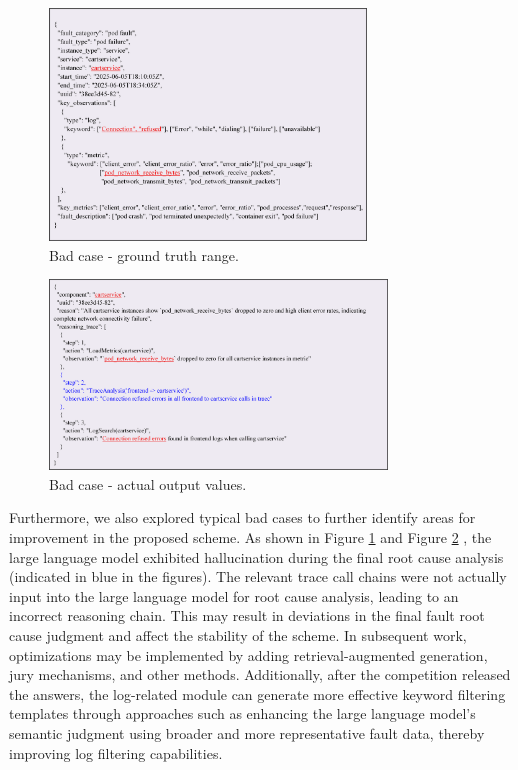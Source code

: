 \documentclass[10pt]{article}
\let\oldref\ref
\renewcommand{\ref}[1]{%
    \textcolor{blue}{\oldref{#1}}%
}
\begin{document}
\begin{figure}[!t]
    \centering
    \includegraphics[width=0.75\textwidth]{fig21.png}
    \caption{Bad case - ground truth range.}
    \label{fig21}
\end{figure}

\begin{figure}[!t]
    \centering
    \includegraphics[width=0.8\textwidth]{fig22.png}
    \caption{Bad case - actual output values.}
    \label{fig22}
\end{figure}

Furthermore, we also explored typical bad cases to further identify areas for improvement in the proposed scheme. As shown in Figure \ref{fig21} and Figure \ref{fig22}, the large language model exhibited hallucination during the final root cause analysis (indicated in blue in the figures). The relevant trace call chains were not actually input into the large language model for root cause analysis, leading to an incorrect reasoning chain. This may result in deviations in the final fault root cause judgment and affect the stability of the scheme. In subsequent work, optimizations may be implemented by adding retrieval-augmented generation, jury mechanisms, and other methods. Additionally, after the competition released the answers, the log-related module can generate more effective keyword filtering templates through approaches such as enhancing the large language model's semantic judgment using broader and more representative fault data, thereby improving log filtering capabilities.
\end{document}

